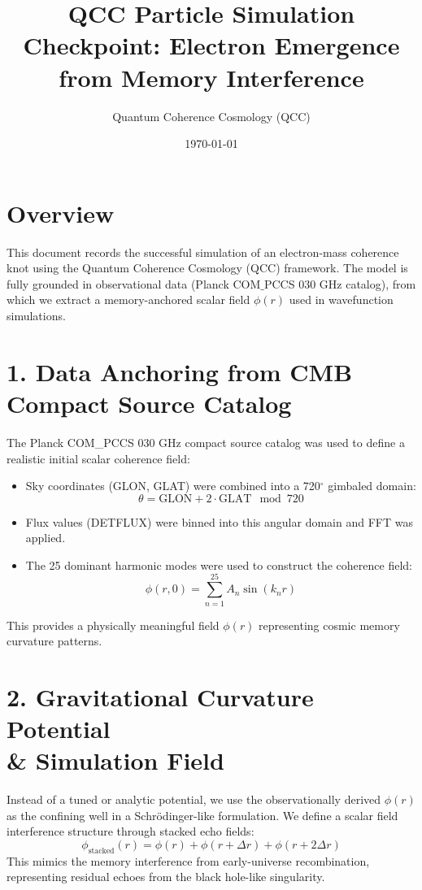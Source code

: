 \documentclass[12pt]{article}
\title{QCC Particle Simulation Checkpoint: Electron Emergence from Memory Interference}
\author{Quantum Coherence Cosmology (QCC)}
\date{\today}
\begin{document}
\maketitle

\section*{Overview}
This document records the successful simulation of an electron-mass coherence knot using the Quantum Coherence Cosmology (QCC) framework. The model is fully grounded in observational data (Planck COM$\_$PCCS 030 GHz catalog), from which we extract a memory-anchored scalar field $\phi(r)$ used in wavefunction simulations.

\section*{1. Data Anchoring from CMB Compact Source Catalog}
The Planck COM\_PCCS 030 GHz compact source catalog was used to define a realistic initial scalar coherence field:
\begin{itemize}
  \item Sky coordinates (GLON, GLAT) were combined into a 720$^\circ$ gimbaled domain: \[ \theta = \text{GLON} + 2 \cdot \text{GLAT} \mod 720 \]
  \item Flux values (DETFLUX) were binned into this angular domain and FFT was applied.
  \item The 25 dominant harmonic modes were used to construct the coherence field:
  \[ \phi(r, 0) = \sum_{n=1}^{25} A_n \sin(k_n r) \]
\end{itemize}
This provides a physically meaningful field $\phi(r)$ representing cosmic memory curvature patterns.

\section*{2. Gravitational Curvature Potential \\ \& Simulation Field}
Instead of a tuned or analytic potential, we use the observationally derived $\phi(r)$ as the confining well in a Schrödinger-like formulation. We define a scalar field interference structure through stacked echo fields:
\[
\phi_\text{stacked}(r) = \phi(r) + \phi(r + \Delta r) + \phi(r + 2\Delta r)
\]
This mimics the memory interference from early-universe recombination, representing residual echoes from the black hole-like singularity.
\end{document}
